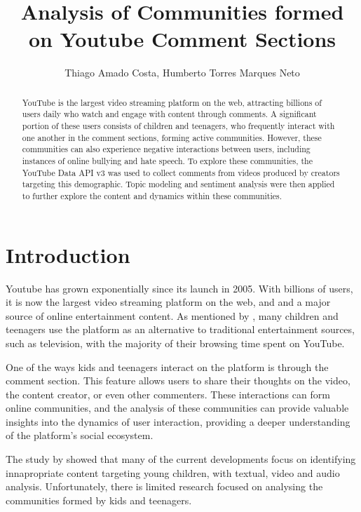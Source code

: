 \documentclass[12pt]{article}
\title{Analysis of Communities formed on Youtube Comment Sections}
\author{Thiago Amado Costa\inst{1}, Humberto Torres Marques Neto\inst{1}}
\begin{document}
\maketitle

\begin{abstract}
    YouTube is the largest video streaming platform on the web, attracting billions of users 
    daily who watch and engage with content through comments. 
    A significant portion of these users consists of children and teenagers, who frequently interact 
    with one another in the comment sections, forming active communities. 
    However, these communities can also experience negative interactions between users, 
    including instances of online bullying and hate speech.
    To explore these communities, the YouTube Data API v3 was used to collect comments 
    from videos produced by creators targeting this demographic. 
    Topic modeling and sentiment analysis were then applied to further explore the 
    content and dynamics within these communities.
\end{abstract}

\section{Introduction}


Youtube has grown exponentially since its launch in 2005. With billions of users, it is now the 
largest video streaming platform on the web, and and a major source of online entertainment content. 
As mentioned by \cite{app13064044}, many children and teenagers use the platform as an alternative to 
traditional entertainment sources, such as television, with the majority of their 
browsing time spent on YouTube.

One of the ways kids and teenagers interact on the platform is through the comment section. 
This feature allows users to share their thoughts on the video, the content creator, 
or even other commenters. These interactions can form online communities, and the analysis of these
communities can provide valuable insights into the dynamics of user interaction, providing a deeper 
understanding of the platform's social ecosystem.

The study by \cite{app13064044} showed that many of the current developments focus on identifying
innapropriate content targeting young children, with textual, video and audio analysis. 
Unfortunately, there is limited research focused on analysing the communities formed by kids and 
teenagers. 
\end{document}
